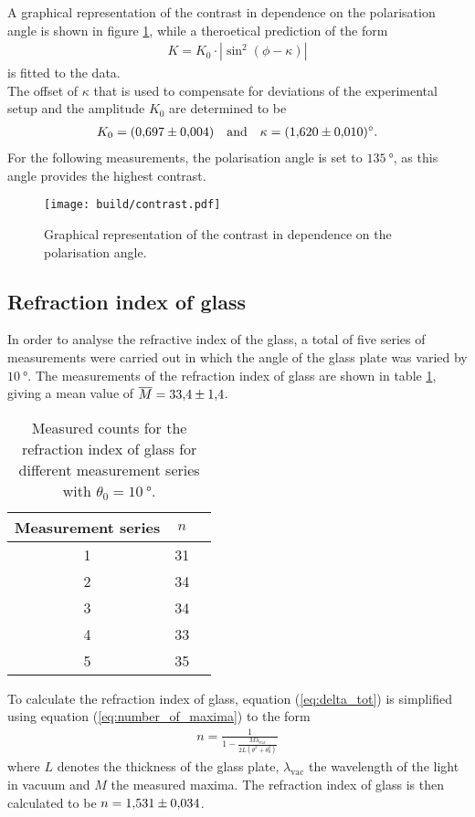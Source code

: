 \noindent
A graphical representation of the contrast in dependence on the polarisation angle is shown in figure \ref{fig:contrast}, while a theroetical prediction of the form
\begin{align}
    K = K_0\cdot|\sin^2(\phi-\kappa)|
\end{align}
is fitted to the data.\\
The offset of $\kappa$ that is used to compensate for deviations of the experimental setup and the amplitude $K_0$ are determined to be
\begin{align*}
    K_0=\SI{0.697\pm0.004}{} \quad \text{and} \quad \kappa=\SI{1.620\pm0.010}{\degree}.
\end{align*}
For the following measurements, the polarisation angle is set to $\SI{135}{\degree}$, as this angle provides the highest contrast.
\begin{figure}[H]
    \centering
    \texttt{[image: build/contrast.pdf]}
    \caption{Graphical representation of the contrast in dependence on the polarisation angle.}
    \label{fig:contrast}
\end{figure}

\subsection{Refraction index of glass}
\label{subsec:refraction_glass}

In order to analyse the refractive index of the glass, a total of five series of measurements were carried out in which the angle of the glass plate was varied by $\SI{10}{\degree}$.
The measurements of the refraction index of glass are shown in table \ref{tab:refraction_glass}, giving a mean value of $\overline M=\num{33.4\pm1.4}$.
\begin{table}[H]
    \centering
    \begin{tabular}{c c c}
        \toprule
        Measurement series & $n$ \\
        \midrule
        1 & 31 \\
        2 & 34 \\
        3 & 34 \\
        4 & 33 \\
        5 & 35 \\
        \bottomrule
    \end{tabular}
    \caption{Measured counts for the refraction index of glass for different measurement series with $\theta_0=\SI{10}{\degree}$.}
    \label{tab:refraction_glass}
\end{table}
\noindent
To calculate the refraction index of glass, equation (\ref{eq:delta_tot}) is simplified using equation (\ref{eq:number_of_maxima}) to the form
\begin{align}
    n = \frac{1}{1-\frac{M\lambda_{\text{vac}}}{2 L(\theta^2 + \theta_0^2)}}
\end{align}
where $L$ denotes the thickness of the glass plate, $\lambda_\text{vac}$ the wavelength of the light in vacuum and $M$ the measured maxima.
The refraction index of glass is then calculated to be $n=\num{1.531 \pm 0.034}$.

